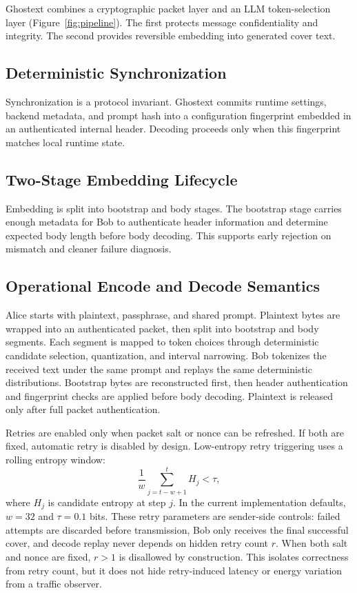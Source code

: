 Ghostext combines a cryptographic packet layer and an LLM token-selection layer (Figure~\ref{fig:pipeline}). The first protects message confidentiality and integrity. The second provides reversible embedding into generated cover text.

\subsection{Deterministic Synchronization}

Synchronization is a protocol invariant. Ghostext commits runtime settings, backend metadata, and prompt hash into a configuration fingerprint embedded in an authenticated internal header. Decoding proceeds only when this fingerprint matches local runtime state.

\subsection{Two-Stage Embedding Lifecycle}

Embedding is split into bootstrap and body stages. The bootstrap stage carries enough metadata for Bob to authenticate header information and determine expected body length before body decoding. This supports early rejection on mismatch and cleaner failure diagnosis.

\subsection{Operational Encode and Decode Semantics}

Alice starts with plaintext, passphrase, and shared prompt. Plaintext bytes are wrapped into an authenticated packet, then split into bootstrap and body segments. Each segment is mapped to token choices through deterministic candidate selection, quantization, and interval narrowing. Bob tokenizes the received text under the same prompt and replays the same deterministic distributions. Bootstrap bytes are reconstructed first, then header authentication and fingerprint checks are applied before body decoding. Plaintext is released only after full packet authentication.

Retries are enabled only when packet salt or nonce can be refreshed. If both are fixed, automatic retry is disabled by design. Low-entropy retry triggering uses a rolling entropy window:
\begin{equation}
\frac{1}{w}\sum_{j=t-w+1}^{t} H_j < \tau,
\end{equation}
where $H_j$ is candidate entropy at step $j$. In the current implementation defaults, $w=32$ and $\tau=0.1$ bits. These retry parameters are sender-side controls: failed attempts are discarded before transmission, Bob only receives the final successful cover, and decode replay never depends on hidden retry count $r$. When both salt and nonce are fixed, $r>1$ is disallowed by construction. This isolates correctness from retry count, but it does not hide retry-induced latency or energy variation from a traffic observer.

